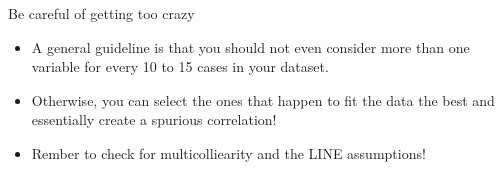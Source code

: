 \documentclass{beamer}\usepackage[]{graphicx}\usepackage[]{color}
\begin{document}
\begin{darkframes}
    \begin{frame}[fragile]{Be careful of getting too crazy}
      \begin{itemize}[<+->]
        \item A general guideline is that you should not even consider more than one variable for every 10 to 15 cases in your dataset. 
        \item Otherwise, you can select the ones that happen to fit the data the best and essentially create a spurious correlation!
        \item Rember to check for multicolliearity and the LINE assumptions!
      \end{itemize} 
    \end{frame}


  \end{darkframes}
\end{document}
